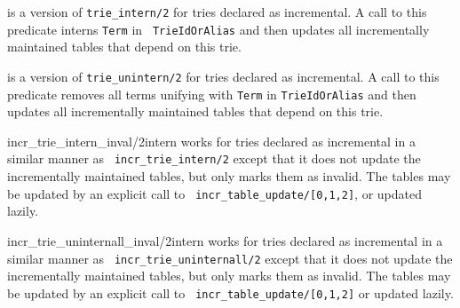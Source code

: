 \begin{description}
%
is a version of {\tt trie\_intern/2} for tries declared as
incremental.  A call to this predicate interns {\tt Term} in {\tt
  TrieIdOrAlias} and then updates all incrementally maintained tables
that depend on this trie.

%
is a version of {\tt trie\_unintern/2} for tries declared as
incremental.  A call to this predicate removes all terms unifying with
{\tt Term} in {\tt TrieIdOrAlias} and then updates all incrementally
maintained tables that depend on this trie.

{incr\_trie\_intern\_inval/2}{intern}
%
works for tries declared as incremental in a similar manner as {\tt
  incr\_trie\_intern/2} except that it does not update the
incrementally maintained tables, but only marks them as invalid. The
tables may be updated by an explicit call to {\tt
  incr\_table\_update/[0,1,2]}, or updated lazily.

{incr\_trie\_uninternall\_inval/2}{intern}
%
works for tries declared as incremental in a similar manner as {\tt
  incr\_trie\_uninternall/2} except that it does not update the
incrementally maintained tables, but only marks them as invalid. The
tables may be updated by an explicit call to {\tt
  incr\_table\_update/[0,1,2]} or updated lazily.
\end{description}

